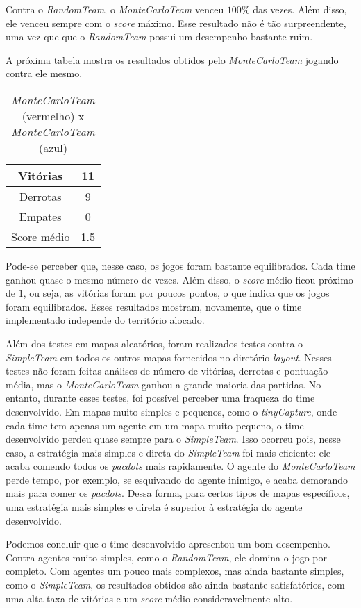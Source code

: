 \documentclass[a4paper,12pt]{article}
\begin{document}
Contra o \textit{RandomTeam}, o \textit{MonteCarloTeam} venceu $100\%$ das vezes. Além disso,
ele venceu sempre com o \textit{score} máximo. Esse resultado não é tão surpreendente,
uma vez que que o \textit{RandomTeam} possui um desempenho bastante ruim.

A próxima tabela mostra os resultados obtidos pelo \textit{MonteCarloTeam} jogando contra
ele mesmo.

\begin{table}[htb!]
    {\centering
    \begin{tabular}{|c|c|} \hline
    Vitórias     & 11  \\ \hline
    Derrotas     & 9   \\ \hline
    Empates      & 0   \\ \hline
    Score médio  & 1.5 \\ \hline
    \end{tabular}
    \caption{\textit{MonteCarloTeam} (vermelho) x \textit{MonteCarloTeam} (azul)}
    }
\end{table}

Pode-se perceber que, nesse caso, os jogos foram bastante equilibrados. Cada time ganhou quase o mesmo
número de vezes. Além disso, o \textit{score} médio ficou próximo de $1$, ou seja, as vitórias foram
por poucos pontos, o que indica que os jogos foram equilibrados. Esses resultados mostram, novamente,
que o time implementado independe do território alocado.

Além dos testes em mapas aleatórios, foram realizados testes contra o \textit{SimpleTeam} em
todos os outros mapas fornecidos no diretório \textit{layout}. Nesses testes não foram feitas
análises de número de vitórias, derrotas e pontuação média, mas o \textit{MonteCarloTeam} ganhou a grande
maioria das partidas. No entanto, durante esses testes, foi possível perceber uma fraqueza
do time desenvolvido. Em mapas muito simples e pequenos, como o \textit{tinyCapture}, onde cada
time tem apenas um agente em um mapa muito pequeno, o time desenvolvido perdeu quase sempre para
o \textit{SimpleTeam}. Isso ocorreu pois, nesse caso, a estratégia mais simples e direta do
\textit{SimpleTeam} foi mais eficiente: ele acaba comendo todos os \textit{pacdots} mais rapidamente.
O agente do \textit{MonteCarloTeam} perde tempo, por exemplo, se esquivando do agente inimigo, e acaba
demorando mais para comer os \textit{pacdots}. Dessa forma, para certos tipos de mapas específicos,
uma estratégia mais simples e direta é superior à estratégia do agente desenvolvido.

Podemos concluir que o time desenvolvido apresentou um bom desempenho. Contra agentes muito simples,
como o \textit{RandomTeam}, ele domina o jogo por completo. Com agentes um pouco mais complexos,
mas ainda bastante simples, como o \textit{SimpleTeam}, os resultados obtidos são ainda bastante
satisfatórios, com uma alta taxa de vitórias e um \textit{score} médio consideravelmente alto.
\end{document}
